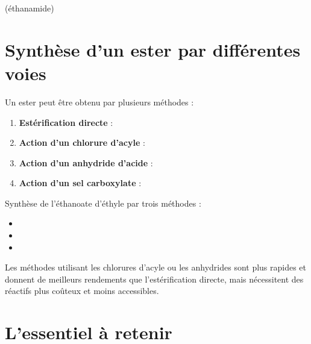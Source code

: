 \begin{exemple}
 (éthanamide)
\end{exemple}

\section{Synthèse d'un ester par différentes voies}

\begin{propriete}
Un ester  peut être obtenu par plusieurs méthodes :
\begin{enumerate}
    \item \textbf{Estérification directe} : 
    \item \textbf{Action d'un chlorure d'acyle} : 
    \item \textbf{Action d'un anhydride d'acide} : 
    \item \textbf{Action d'un sel carboxylate} : 
\end{enumerate}
\end{propriete}

\begin{exemple}
Synthèse de l'éthanoate d'éthyle par trois méthodes :
\begin{itemize}
    \item {}
    \item {}
    \item {}
\end{itemize}
\end{exemple}

\begin{remarque}
Les méthodes utilisant les chlorures d'acyle ou les anhydrides sont plus rapides et donnent de meilleurs rendements que l'estérification directe, mais nécessitent des réactifs plus coûteux et moins accessibles.
\end{remarque}

\section{L'essentiel à retenir}

